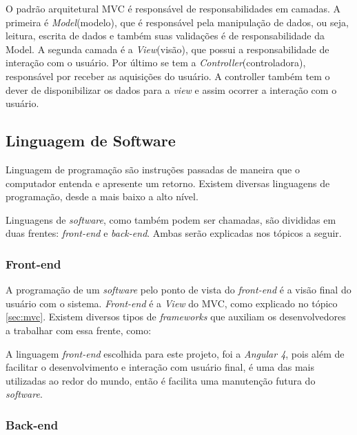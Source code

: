 O padrão arquitetural MVC é responsável de responsabilidades em camadas. A primeira é \textit{Model}(modelo), que é responsável pela manipulação de dados, ou seja, leitura, escrita de dados e também suas validações é de responsabilidade da Model. A segunda camada é a \textit{View}(visão), que possui a responsabilidade de interação com o usuário. Por último se tem a \textit{Controller}(controladora), responsável por receber as aquisições do usuário. A controller também tem o dever de disponibilizar os dados para a \textit{view} e assim ocorrer a interação com o usuário.

\subsection{Linguagem de Software}

Linguagem de programação são instruções passadas de maneira que o computador entenda e apresente um retorno. Existem diversas linguagens de programação, desde a mais baixo a alto nível.

Linguagens de \textit{software}, como também podem ser chamadas, são divididas em duas frentes: \textit{front-end} e \textit{back-end}. Ambas serão explicadas nos tópicos a seguir.

\subsubsection{Front-end}

A programação de um \textit{software} pelo ponto de vista do \textit{front-end} é a visão final do usuário com o sistema. \textit{Front-end} é a \textit{View} do MVC, como explicado no tópico \ref{sec:mvc}. Existem diversos tipos de \textit{frameworks} que auxiliam os desenvolvedores a trabalhar com essa frente, como:


A linguagem \textit{front-end} escolhida para este projeto, foi a \textit{Angular 4}, pois além de facilitar o desenvolvimento e interação com usuário final, é uma das mais utilizadas ao redor do mundo, então é facilita uma manutenção futura do \textit{software}.

\subsubsection{Back-end}

